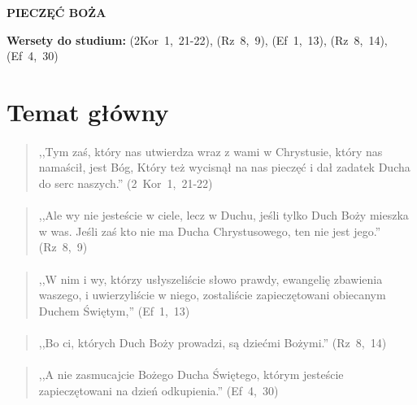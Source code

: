\documentclass[10pt,a4paper,oneside]{article}
\begin{document}
\centerline{\textbf{\MakeUppercase{Pieczęć Boża}}}
\begin{center}
\textbf{Wersety do studium:} 
\mbox{(2Kor 1, 21-22)}, \mbox{(Rz 8, 9)}, \mbox{(Ef 1, 13)}, \mbox{(Rz 8, 14)}, \mbox{(Ef 4, 30)}
\end{center}
\section{Temat główny}
\paragraph{}
\begin{quote}
,,Tym zaś, który nas utwierdza wraz z wami w Chrystusie, który nas namaścił, jest Bóg, Który też wycisnął na nas pieczęć i dał zadatek Ducha do serc naszych.'' \mbox{(2 Kor 1, 21-22)}
\end{quote}
\paragraph{}
\begin{quote}
,,Ale wy nie jesteście w ciele, lecz w Duchu, jeśli tylko Duch Boży mieszka w was. Jeśli zaś kto nie ma Ducha Chrystusowego, ten nie jest jego.'' \mbox{(Rz 8, 9)}
\end{quote}
\paragraph{}
\begin{quote}
,,W nim i wy, którzy usłyszeliście słowo prawdy, ewangelię zbawienia waszego, i uwierzyliście w niego, zostaliście zapieczętowani obiecanym Duchem Świętym,'' \mbox{(Ef 1, 13)}
\end{quote}
\paragraph{}
\begin{quote}
,,Bo ci, których Duch Boży prowadzi, są dziećmi Bożymi.'' \mbox{(Rz 8, 14)}
\end{quote}
\paragraph{}
\begin{quote}
,,A nie zasmucajcie Bożego Ducha Świętego, którym jesteście zapieczętowani na dzień odkupienia.'' \mbox{(Ef 4, 30)}
\end{quote}
\end{document}
